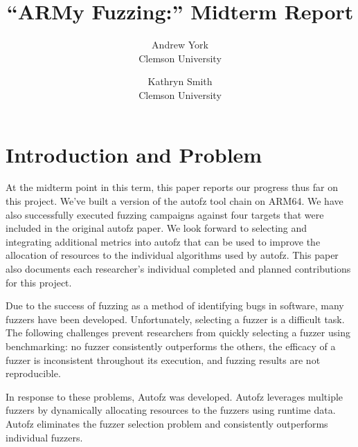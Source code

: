 
\graphicspath{ {./images/} }

\date{}

\title{\Large \bf “ARMy Fuzzing:” Midterm Report}

\author{
{\rm Andrew York}\\
Clemson University
\and
{\rm Kathryn Smith}\\
Clemson University
} %

\maketitle

\section{Introduction and Problem}

At the midterm point in this term, this paper reports our progress thus far on
this project. We've built a version of the autofz tool chain on ARM64. We have
also successfully executed fuzzing campaigns against four targets that were included
in the original autofz paper. We look forward to selecting and integrating additional
metrics into autofz that can be used to improve the allocation of resources to the
individual algorithms used by autofz. This paper also documents each researcher's
individual completed and planned contributions for this project.

Due to the success of fuzzing as a method of identifying bugs in software, many fuzzers have been developed.
Unfortunately, selecting a fuzzer is a difficult task. The following challenges
prevent researchers from quickly selecting a fuzzer using benchmarking: no fuzzer
consistently outperforms the others, the efficacy of a fuzzer is inconsistent
throughout its execution, and fuzzing results are not reproducible.

In response to these problems, Autofz was developed. Autofz leverages multiple
fuzzers by dynamically allocating resources to the fuzzers using runtime data.
Autofz eliminates the fuzzer selection problem and consistently outperforms
individual fuzzers.


